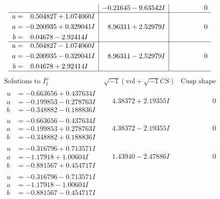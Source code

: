 \documentclass[1p]{elsarticle_modified}
\theoremstyle{definition}
\newcommand{\I}{\sqrt{-1}}
\begin{document}
$$\begin{array}{c|c|c}
 & -0.21645 - 9.63542 I & \phantom{-0.000000 } 0 \\ \hline\begin{aligned}
u &= \phantom{-}0.504827 + 1.074060 I \\
a &= -0.200935 + 0.329041 I \\
b &= \phantom{-}0.04678 - 2.92414 I\end{aligned}
 & \phantom{-}8.96311 + 2.52979 I & \phantom{-0.000000 } 0 \\ \hline\begin{aligned}
u &= \phantom{-}0.504827 - 1.074060 I \\
a &= -0.200935 - 0.329041 I \\
b &= \phantom{-}0.04678 + 2.92414 I\end{aligned}
 & \phantom{-}8.96311 - 2.52979 I & \phantom{-0.000000 } 0\\
 \hline 
 \end{array}$$\newpage$$\begin{array}{c|c|c}  
\text{Solutions to }I^u_{1}& \I (\text{vol} + \sqrt{-1}CS) & \text{Cusp shape}\\
 \hline 
\begin{aligned}
u &= -0.663656 + 0.437634 I \\
a &= -0.199853 - 0.278763 I \\
b &= -0.348882 - 0.188836 I\end{aligned}
 & \phantom{-}4.38372 + 2.19355 I & \phantom{-0.000000 } 0 \\ \hline\begin{aligned}
u &= -0.663656 - 0.437634 I \\
a &= -0.199853 + 0.278763 I \\
b &= -0.348882 + 0.188836 I\end{aligned}
 & \phantom{-}4.38372 - 2.19355 I & \phantom{-0.000000 } 0 \\ \hline\begin{aligned}
u &= -0.316796 + 0.713571 I \\
a &= -1.17918 + 1.00604 I \\
b &= -0.881567 + 0.454717 I\end{aligned}
 & \phantom{-}1.43940 - 2.47886 I & \phantom{-0.000000 } 0 \\ \hline\begin{aligned}
u &= -0.316796 - 0.713571 I \\
a &= -1.17918 - 1.00604 I \\
b &= -0.881567 - 0.454717 I\end{aligned}

\end{array}$$
\end{document}
